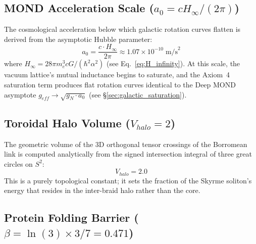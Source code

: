 \subsection{MOND Acceleration Scale ($a_0 = c H_\infty / (2\pi)$)}

The cosmological acceleration below which galactic rotation curves
flatten is derived from the asymptotic Hubble parameter:
\begin{equation}
    a_0 = \frac{c \cdot H_\infty}{2\pi}
    \approx 1.07 \times 10^{-10}\;\text{m/s}^2
\end{equation}
where $H_\infty = 28\pi m_e^3 c G / (\hbar^2 \alpha^2)$ (see
Eq.~\ref{eq:H_infinity}).  At this scale, the vacuum lattice's
mutual inductance begins to saturate, and the Axiom~4 saturation
term produces flat rotation curves identical to the Deep MOND
asymptote $g_{eff} \to \sqrt{g_N \cdot a_0}$ (see
\S\ref{sec:galactic_saturation}).

\subsection{Toroidal Halo Volume ($V_{halo} = 2$)}

The geometric volume of the 3D orthogonal tensor crossings of the
Borromean link is computed analytically from the signed intersection
integral of three great circles on $S^2$:
\begin{equation}
    V_{halo} = 2.0
\end{equation}
This is a purely topological constant; it sets the fraction of
the Skyrme soliton's energy that resides in the inter-braid halo
rather than the core.

\subsection{Protein Folding Barrier ($\beta = \ln(3) \times 3/7 = 0.471$)}

